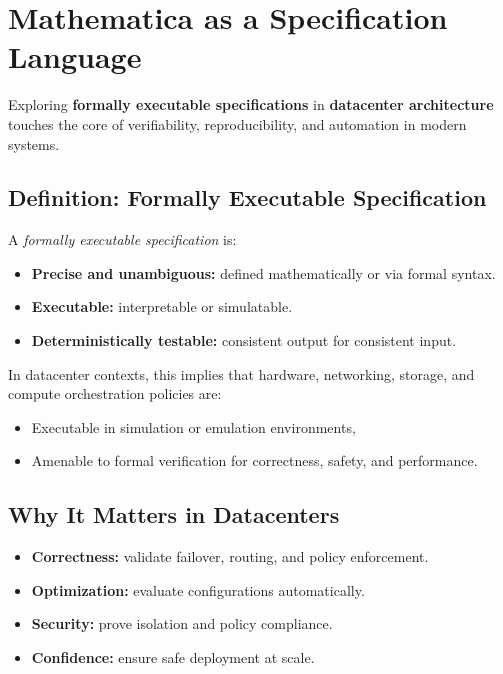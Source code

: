 \documentclass[../../../OAE-SPEC-MAIN.tex]{subfiles}
\begin{document}
\section{Mathematica as a Specification Language}

Exploring \textbf{formally executable specifications} in \textbf{datacenter architecture} touches the core of verifiability, reproducibility, and automation in modern systems.

\subsection*{Definition: Formally Executable Specification}

\begin{marginfigure}
\small
A \emph{formally executable specification} is:
\begin{itemize}[leftmargin=*]
  \item \textbf{Precise and unambiguous:} defined mathematically or via formal syntax.
  \item \textbf{Executable:} interpretable or simulatable.
  \item \textbf{Deterministically testable:} consistent output for consistent input.
\end{itemize}
\end{marginfigure}

In datacenter contexts, this implies that hardware, networking, storage, and compute orchestration policies are:
\begin{itemize}
  \item Executable in simulation or emulation environments,
  \item Amenable to formal verification for correctness, safety, and performance.
\end{itemize}

\subsection*{Why It Matters in Datacenters}

\begin{itemize}
  \item \textbf{Correctness:} validate failover, routing, and policy enforcement.
  \item \textbf{Optimization:} evaluate configurations automatically.
  \item \textbf{Security:} prove isolation and policy compliance.
  \item \textbf{Confidence:} ensure safe deployment at scale.
\end{itemize}
\end{document}

